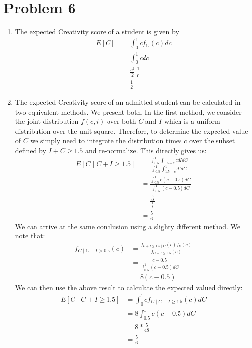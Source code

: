\documentclass[12pt]{article}
\begin{document}
\pagebreak
\section*{Problem 6}

\begin{enumerate}
\item The expected Creativity score of a student is given by:
\begin{align*}
E[C] &= \int_{0}^1 c f_C(c) dc \\
&= \int_0^1 c dc \tag{$f_C(c) = 1$} \\
&= \frac{c^2}{2}\big\vert_0^1 \\
&= \frac{1}{2} 
\end{align*}
\item The expected Creativity score of an admitted student can be calculated in two equivalent methods. We present both. In the first method, we consider the joint distribution $f(c,i)$ over both $C$ and $I$ which is a uniform distribution over the unit square. Therefore, to determine the expected value of $C$ we simply need to integrate the distribution times $c$ over the subset defined by $I + C \geq 1.5$ and re-normalize. This directly gives us:
\begin{align*}
E[C \mid C + I \geq 1.5] &= \frac{\int_{0.5}^1\int_{1.5 - c}^1 c dIdC}{\int_{0.5}^1\int_{1.5 -c}^1dI dC} \\
&=\frac{\int_{0.5}^1c(c-0.5)dC}{\int_{0.5}^1 (c- 0.5) dC} \\
&= \frac{\frac{5}{48}}{\frac{1}{8}} \\
&= \frac{5}{6}
\end{align*}
We can arrive at the same conclusion using a slighty different method. We note that:
\begin{align*}
f_{C \mid C + I > 0.5}(c) &= \frac{f_{C+I \geq 1.5 \mid C}(c)f_{C}(c)}{f_{C + I \geq 1.5}(c)} \\
&= \frac{c-0.5}{\int_{0.5}^1 (c- 0.5) dC} \\
&= 8(c - 0.5) \tag{zero where $c \notin [0.5, 1]$}
\end{align*}
We can then use the above result to calculate the expected valued directly:
\begin{align*}
E[C \mid C + I \geq 1.5] &= \int_{0}^1 c f_{C \mid C + I \geq 1.5}(c) dC \\
&= 8\int_{0.5}^1 c(c-0.5) dC \\
&= 8*\frac{5}{48} \\
&= \frac{5}{6}
\end{align*}


\end{enumerate}
\end{document}
